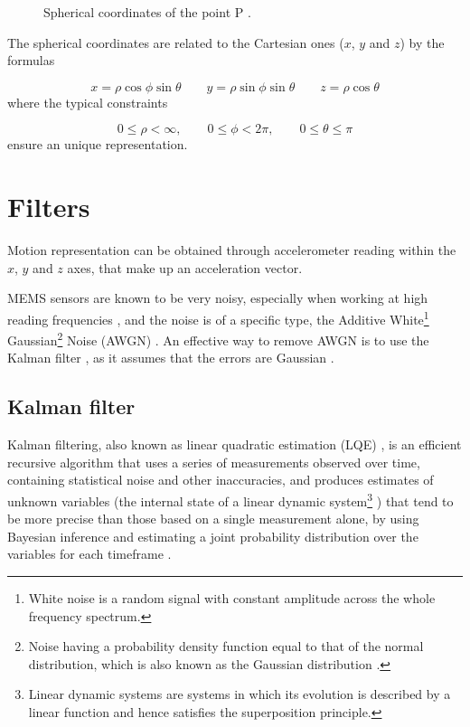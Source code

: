 \begin{center}
	\begin{figure}[ht]
		\caption{Spherical coordinates of the point P \cite{HartleySpherical}.}
	\end{figure}
\end{center}
The spherical coordinates are related to the Cartesian ones ($x$, $y$ and $z$) by the formulas \cite{Sok}

\[
	x = \rho \cos\phi \sin\theta \quad\quad y = \rho \sin\phi \sin\theta \quad\quad  z = \rho \cos\theta
\]
where the typical constraints

\[
	0 \leq \rho < \infty, \quad\quad 0 \leq \phi < 2\pi, \quad\quad 0 \leq \theta \leq \pi
\]
ensure an unique representation.

\section{Filters}
Motion representation can be obtained through accelerometer reading within the $x$, $y$ and $z$ axes, that make up an acceleration vector.

MEMS sensors are known to be very noisy, especially when working at high reading frequencies \cite[7]{Mat08}, and the noise is of a specific type, the Additive White\footnote{White noise is a random signal with constant amplitude across the whole frequency spectrum.} Gaussian\footnote{Noise having a probability density function equal to that of the normal distribution, which is also known as the Gaussian distribution \cite{WikipediaGaussianNoise}.} Noise (AWGN) \cite{Yas03}. An effective way to remove AWGN is to use the Kalman filter \cite{Ko07, Sär15}, as it assumes that the errors are Gaussian \cite{Kal60}.

\subsection{Kalman filter}
Kalman filtering, also known as linear quadratic estimation (LQE) \cite{Ma19}, is an efficient recursive algorithm that uses a series of measurements observed over time, containing statistical noise and other inaccuracies, and produces estimates of unknown variables \cite[7-8]{Ma19} (the internal state of a linear dynamic system\footnote{Linear dynamic systems are systems in which its evolution is described by a linear function and hence satisfies the superposition principle.} \cite[47]{Ma19}) that tend to be more precise than those based on a single measurement alone, by using Bayesian inference and estimating a joint probability distribution over the variables for each timeframe \cite[8]{Ma19}.

